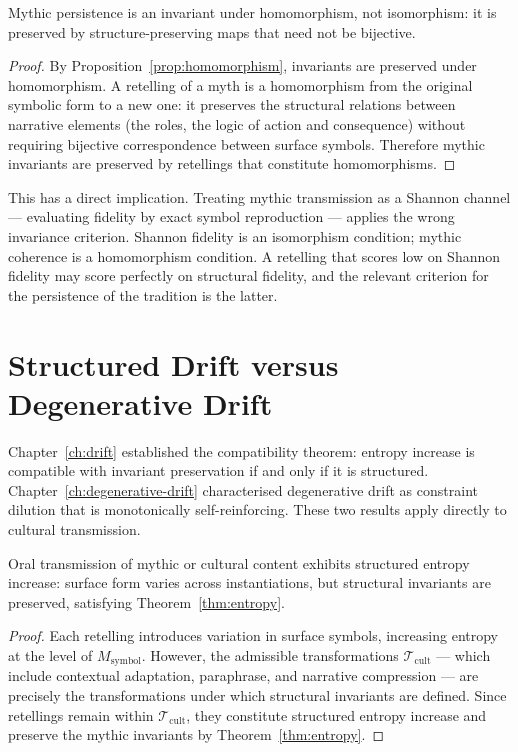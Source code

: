 \documentclass[11pt,openany]{book}
\begin{document}
\begin{proposition}
\label{prop:myth-homomorphic}
Mythic persistence is an invariant under homomorphism, not
isomorphism: it is preserved by structure-preserving maps
that need not be bijective.
\end{proposition}

\begin{proof}
By Proposition~\ref{prop:homomorphism}, invariants are
preserved under homomorphism.  A retelling of a myth is a
homomorphism from the original symbolic form to a new one:
it preserves the structural relations between narrative
elements (the roles, the logic of action and consequence)
without requiring bijective correspondence between surface
symbols.  Therefore mythic invariants are preserved by
retellings that constitute homomorphisms.
\end{proof}

This has a direct implication.  Treating mythic transmission
as a Shannon channel — evaluating fidelity by exact symbol
reproduction — applies the wrong invariance criterion.
Shannon fidelity is an isomorphism condition; mythic
coherence is a homomorphism condition.  A retelling that
scores low on Shannon fidelity may score perfectly on
structural fidelity, and the relevant criterion for the
persistence of the tradition is the latter.

\section{Structured Drift versus Degenerative Drift}
\label{sec:drift-distinction}

Chapter~\ref{ch:drift} established the compatibility
theorem: entropy increase is compatible with invariant
preservation if and only if it is structured.
Chapter~\ref{ch:degenerative-drift} characterised
degenerative drift as constraint dilution that is
monotonically self-reinforcing.  These two results apply
directly to cultural transmission.

\begin{proposition}
\label{prop:oral-structured}
Oral transmission of mythic or cultural content exhibits
structured entropy increase: surface form varies across
instantiations, but structural invariants are preserved,
satisfying Theorem~\ref{thm:entropy}.
\end{proposition}

\begin{proof}
Each retelling introduces variation in surface symbols,
increasing entropy at the level of $M_{\mathrm{symbol}}$.
However, the admissible transformations
$\mathcal{T}_{\mathrm{cult}}$ — which include contextual
adaptation, paraphrase, and narrative compression — are
precisely the transformations under which structural
invariants are defined.  Since retellings remain within
$\mathcal{T}_{\mathrm{cult}}$, they constitute structured
entropy increase and preserve the mythic invariants by
Theorem~\ref{thm:entropy}.
\end{proof}
\end{document}
